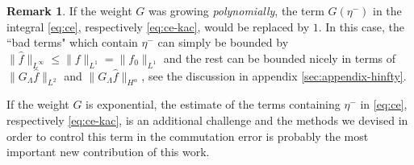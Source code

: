 \documentclass[11pt,a4paper,reqno]{amsart}
\theoremstyle{plain}
\theoremstyle{definition}
\newtheorem{remark}[proposition]{Remark}
\begin{document}
\begin{remark} If the weight $G$ was growing \emph{polynomially}, the term $G(\eta^-)$ in the integral \eqref{eq:ce}, respectively \eqref{eq:ce-kac}, would be replaced by $1$. In this case, the ``bad terms" which contain $\eta^-$ can simply be bounded by
 $\|\hat{f}\|_{L^\infty}\le \|f\|_{L^1} = \|f_0\|_{L^1}$ and the rest can be bounded nicely in terms of $\|G_\Lambda\hat{f}\|_{L^2}$ and $\|G_\Lambda\hat{f}\|_{H^\alpha}$, see the discussion in appendix \ref{sec:appendix-hinfty}.

 If the weight  $G$ is exponential, the estimate of the terms containing $\eta^-$ in \eqref{eq:ce}, respectively \eqref{eq:ce-kac}, is an additional challenge and the methods we devised in order to control this term in the commutation error is probably the most important new contribution of this work.
 \end{remark}
\end{document}
